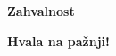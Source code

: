 \documentclass[aspectratio=169,xcolor=dvipsnames]{beamer}
\begin{document}
\begin{frame}

	\Huge{{\centerline{\textbf{Zahvalnost}}}}
    
\end{frame}


\begin{frame}

	\Huge{{\centerline{\textbf{Hvala na pažnji!}}}}
    
\end{frame}




\end{document}
